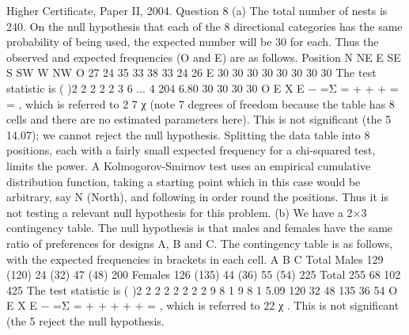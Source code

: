 \documentclass[a4paper,12pt]{article}
\begin{document}
Higher Certificate, Paper II, 2004. Question 8
(a) The total number of nests is 240. On the null hypothesis that each of the 8
directional categories has the same probability of being used, the expected number
will be 30 for each. Thus the observed and expected frequencies (O and E) are as
follows.
Position N NE E SE S SW W NW
O 27 24 35 33 38 33 24 26
E 30 30 30 30 30 30 30 30
The test statistic is
( )2 2 2 2
2 3 6 ... 4 204 6.80
30 30 30 30
O E
X
E
−
=Σ = + + + = = ,
which is referred to 2
7 χ (note 7 degrees of freedom because the table has 8 cells and
there are no estimated parameters here). This is not significant (the 5%
14.07); we cannot reject the null hypothesis.
Splitting the data table into 8 positions, each with a fairly small expected frequency
for a chi-squared test, limits the power.
A Kolmogorov-Smirnov test uses an empirical cumulative distribution function,
taking a starting point which in this case would be arbitrary, say N (North), and
following in order round the positions. Thus it is not testing a relevant null hypothesis
for this problem.
(b) We have a 2×3 contingency table. The null hypothesis is that males and
females have the same ratio of preferences for designs A, B and C. The contingency
table is as follows, with the expected frequencies in brackets in each cell.
A B C Total
Males 129 (120) 24 (32) 47 (48) 200
Females 126 (135) 44 (36) 55 (54) 225
Total 255 68 102 425
The test statistic is
( )2 2 2 2 2 2 2
2 9 8 1 9 8 1 5.09
120 32 48 135 36 54
O E
X
E
−
=Σ = + + + + + = ,
which is referred to 22
χ . This is not significant (the 5%
reject the null hypothesis.
\end{document}
